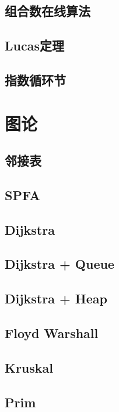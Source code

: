 \documentclass[a4paper, 12pt]{article}
\begin{document}
\subsection{组合数在线算法}

\subsection{Lucas定理}

\subsection{指数循环节}


\section{图论}
\subsection{邻接表}

\subsection{SPFA}

\subsection{Dijkstra}

\subsection{Dijkstra + Queue}

\subsection{Dijkstra + Heap}

\subsection{Floyd Warshall}

\subsection{Kruskal}

\subsection{Prim}

\end{document}

